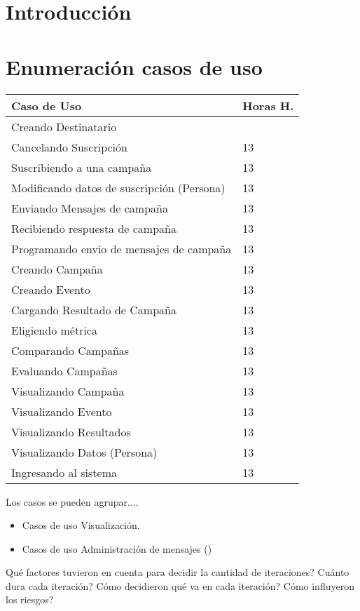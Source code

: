 \documentclass[a4paper, 11pt]{article}
\begin{document}
\pagestyle{myheadings}
\maketitle

\thispagestyle{empty}
\tableofcontents

\newpage

\section{Introducción}


\newpage
\section{Enumeraci\'on casos de uso}


\begin{table}[H]
\centering
\begin{tabular}{ | p{10cm} | p{1cm} |}
\hline
Caso de Uso & Horas H.\\ \hline \hline
Creando Destinatario \\ \hline \hline
Cancelando Suscripci\'on& 13 \\ \hline
Suscribiendo a una campaña& 13 \\ \hline
Modificando datos de suscripci\'on (Persona)& 13 \\ \hline
Enviando Mensajes de campaña& 13 \\ \hline
Recibiendo respuesta de campaña& 13 \\ \hline
Programando envio de mensajes de campaña& 13 \\ \hline
Creando Campaña& 13 \\ \hline
Creando Evento& 13 \\ \hline
Cargando Resultado de Campaña& 13 \\ \hline
Eligiendo métrica& 13 \\ \hline
Comparando Campañas& 13 \\ \hline
Evaluando Campañas& 13 \\ \hline
Visualizando Campaña& 13 \\ \hline
Visualizando Evento& 13 \\ \hline
Visualizando Resultados & 13 \\ \hline
Visualizando Datos (Persona) & 13 \\ \hline
Ingresando al sistema & 13 \\ \hline

\end{tabular}
\end{table}
Los casos se pueden agrupar....
\begin{itemize}
\item Casos de uso Visualizaci\'on.
\item Casos de uso Administraci\'on de mensajes ()
\end{itemize}
Qué factores tuvieron en cuenta para decidir la cantidad de iteraciones?
Cuánto dura cada iteración?
Cómo decidieron qué va en cada iteración?
Cómo influyeron los riesgos?
\end{document}
